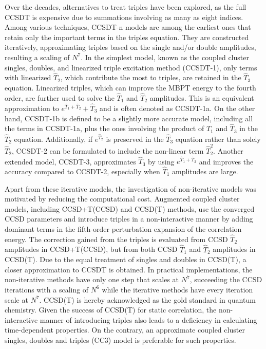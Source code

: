Over the decades, alternatives to treat triples have been explored, as the full CCSDT is expensive due to summations involving as many as eight indices. Among various techniques, CCSDT-n\cite{Noga1987ccsdtn} models are among the earliest ones that retain only the important terms in the triples equation. They are constructed iteratively, approximating triples based on the single and/or double amplitudes, resulting a scaling of $N^{7}$. In the simplest model, known as the coupled cluster singles, doubles, and linearized triple excitation method (CCSDT-1),\cite{Lee1984, Urban1985} only terms with linearized $\hat{T}_{2}$, which contribute the most to triples, are retained in the $\hat{T}_{3}$ equation. Linearized triples, which can improve the MBPT energy to the fourth order, are further used to solve the $\hat{T}_{1}$ and $\hat{T}_{2}$ amplitudes. This is an equivalent approximation to $e^{\hat{T}_{1}+\hat{T}_{2}} + \hat{T}_{3}$ and is often denoted as CCSDT-1a. On the other hand, CCSDT-1b is defined to be a slightly more accurate model, including all the terms in CCSDT-1a, plus the ones involving the product of $\hat{T}_{1}$ and $\hat{T}_{3}$ in the $\hat{T}_{2}$ equation. Additionally, if $e^{\hat{T}_{2}}$ is preserved in the $\hat{T}_{3}$ equation rather than solely $\hat{T}_{2}$, CCSDT-2\cite{Noga1987ccsdtn} can be formulated to include the non-linear term $\hat{T}_{2}^{2}$. Another extended model, CCSDT-3,\cite{Noga1987ccsdtn} approximates $\hat{T}_{3}$ by using $e^{\hat{T}_{1} + \hat{T}_{2}}$ and improves the accuracy compared to CCSDT-2, especially when $\hat{T}_{1}$ amplitudes are large. 

Apart from these iterative models, the investigation of non-iterative models was motivated by reducing the computational cost. Augmented coupled cluster models, including CCSD+T(CCSD)\cite{Urban1985} and CCSD(T)\cite{Raghavachari1989, Stanton1997} methods, use the converged CCSD parameters and introduce triples in a non-interactive manner by adding dominant terms in the fifth-order perturbation expansion of the correlation energy. The correction gained from the triples is evaluated from CCSD $\hat{T}_{2}$ amplitudes in CCSD+T(CCSD), but from both CCSD $\hat{T}_{1}$ and $\hat{T}_{2}$ amplitudes in CCSD(T). Due to the equal treatment of singles and doubles in CCSD(T), a closer approximation to CCSDT is obtained. In practical implementations, the non-iterative methods have only one step that scales at $N^{7}$, succeeding the CCSD iterations with a scaling of $N^{6}$ while the iterative methods have every iteration scale at $N^{7}$. CCSD(T) is hereby acknowledged as the gold standard in quantum chemistry. Given the success of CCSD(T) for static correlation, the non-interactive manner of introducing triples also leads to a deficiency in calculating time-dependent properties. On the contrary, an approximate coupled cluster singles, doubles and triples (CC3)\cite{Koch1997} model is preferable for such properties. 

